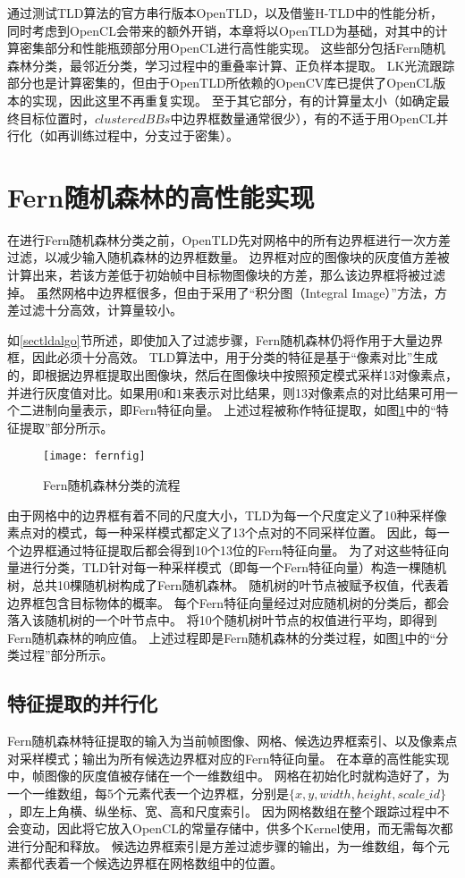 通过测试TLD算法的官方串行版本OpenTLD，以及借鉴H-TLD中的性能分析，
同时考虑到OpenCL会带来的额外开销，本章将以OpenTLD为基础，对其中的计算密集部分和性能瓶颈部分用OpenCL进行高性能实现。
这些部分包括Fern随机森林分类，最邻近分类，学习过程中的重叠率计算、正负样本提取。
LK光流跟踪部分也是计算密集的，但由于OpenTLD所依赖的OpenCV库已提供了OpenCL版本的实现，因此这里不再重复实现。
至于其它部分，有的计算量太小（如确定最终目标位置时，$clusteredBBs$中边界框数量通常很少），有的不适于用OpenCL并行化（如再训练过程中，分支过于密集）。

\section{Fern随机森林的高性能实现}
在进行Fern随机森林分类之前，OpenTLD先对网格中的所有边界框进行一次方差过滤，以减少输入随机森林的边界框数量。
边界框对应的图像块的灰度值方差被计算出来，若该方差低于初始帧中目标物图像块的方差，那么该边界框将被过滤掉。
虽然网格中边界框很多，但由于采用了``积分图（Integral Image）''方法，方差过滤十分高效，计算量较小。

如\ref{sectldalgo}节所述，即使加入了过滤步骤，Fern随机森林仍将作用于大量边界框，因此必须十分高效。
TLD算法中，用于分类的特征是基于``像素对比''生成的，即根据边界框提取出图像块，然后在图像块中按照预定模式采样13对像素点，并进行灰度值对比。如果用$0$和$1$来表示对比结果，则13对像素点的对比结果可用一个二进制向量表示，即Fern特征向量。
上述过程被称作特征提取，如图\ref{fernfig}中的``特征提取''部分所示。

\begin{figure}[htb]
  \centering
  \texttt{[image: fernfig]}
  \caption{Fern随机森林分类的流程}
  \label{fernfig}
\end{figure}

由于网格中的边界框有着不同的尺度大小，TLD为每一个尺度定义了10种采样像素点对的模式，每一种采样模式都定义了13个点对的不同采样位置。
因此，每一个边界框通过特征提取后都会得到10个13位的Fern特征向量。
为了对这些特征向量进行分类，TLD针对每一种采样模式（即每一个Fern特征向量）构造一棵随机树，总共10棵随机树构成了Fern随机森林。
随机树的叶节点被赋予权值，代表着边界框包含目标物体的概率。
每个Fern特征向量经过对应随机树的分类后，都会落入该随机树的一个叶节点中。
将10个随机树叶节点的权值进行平均，即得到Fern随机森林的响应值。
上述过程即是Fern随机森林的分类过程，如图\ref{fernfig}中的``分类过程''部分所示。

\subsection{特征提取的并行化}
Fern随机森林特征提取的输入为当前帧图像、网格、候选边界框索引、以及像素点对采样模式；输出为所有候选边界框对应的Fern特征向量。
在本章的高性能实现中，帧图像的灰度值被存储在一个一维数组中。
网格在初始化时就构造好了，为一个一维数组，每5个元素代表一个边界框，分别是$\{x, y, width, height, scale\_id\}$，即左上角横、纵坐标、宽、高和尺度索引。
因为网格数组在整个跟踪过程中不会变动，因此将它放入OpenCL的常量存储中，供多个Kernel使用，而无需每次都进行分配和释放。
候选边界框索引是方差过滤步骤的输出，为一维数组，每个元素都代表着一个候选边界框在网格数组中的位置。




